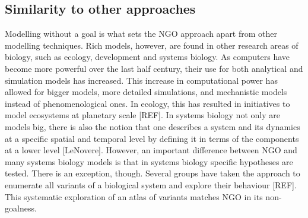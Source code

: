 \subsection{Similarity to other approaches}

Modelling without a goal is what sets the NGO approach apart from other modelling techniques. Rich models, however, are found in other research areas of biology, such as ecology, development and systems biology. As computers have become more powerful over the last half century, their use for both analytical and simulation models has increased. This increase in computational power has allowed for bigger models, more detailed simulations, and mechanistic models instead of phenomenological ones. In ecology, this has resulted in initiatives to model ecosystems at planetary scale [REF]. In systems biology not only are models big, there is also the notion that one describes a system and its dynamics at a specific spatial and temporal level by defining it in terms of the components at a lower level [LeNovere]. However, an important difference between NGO and many systems biology models is that in systems biology specific hypotheses are tested. There is an exception, though. Several groups have taken the approach to enumerate all variants of a biological system and explore their behaviour [REF]. This systematic exploration of an atlas of variants matches NGO in its non-goalness.